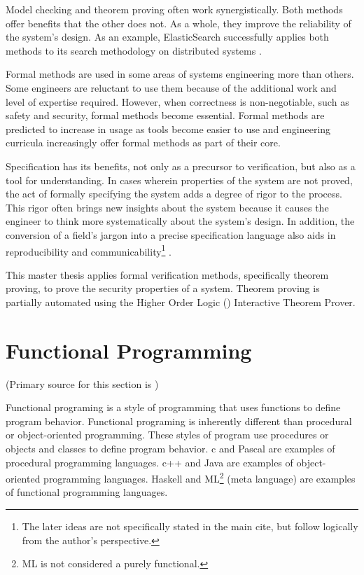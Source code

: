 \documentclass[../../main/main.tex]{subfiles}
\begin{document}
Model checking and theorem proving often work synergistically.  Both methods offer benefits that the other does not.  As a whole, they improve the reliability of the system's design.   As an example, ElasticSearch successfully applies both methods to its search methodology on distributed systems \cite{elasticsearch}.  

Formal methods are used in some areas of systems engineering more than others.  Some engineers are reluctant to use them because of the additional work and level of expertise required.  However, when correctness is non-negotiable, such as safety and security, formal methods become essential.  Formal methods are predicted to increase in usage as tools become easier to use and engineering curricula increasingly offer formal methods as part of their core\cite{formalCarnegie}.

Specification has its benefits, not only as a precursor to verification, but also as a tool for understanding.  In cases wherein properties of the system are not proved, the act of formally specifying the system adds a degree of rigor to the process. This rigor often brings new insights about the system because it causes the engineer to think more systematically about the system's design.  In addition, the conversion of a field's jargon into a precise specification language also aids in reproducibility and communicability\footnote{The later ideas are not specifically stated in the main cite, but follow logically from the author's perspective.} \cite{formalCarnegie}.  

This master thesis applies formal verification methods, specifically theorem proving, to prove the security properties of a system.  Theorem proving is partially automated using the Higher Order Logic () Interactive Theorem Prover. 

\section{Functional Programming}
(Primary source for this section is \cite{functionalprogramming})

Functional programing is a style of programming that uses functions to define program behavior.  Functional programing is inherently different than procedural or object-oriented programming. These styles of program use procedures or objects and classes to define program behavior.  c  and Pascal are examples of procedural programming languages.  c++ and Java are examples of object-oriented programming languages.  Haskell and ML\footnote{ML is not considered a purely functional.} (meta language) are examples of functional programming languages.  
\end{document}
